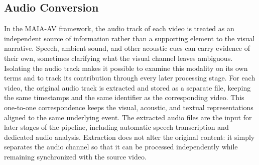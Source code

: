 \subsection*{Audio Conversion}
In the MAIA-AV framework, the audio track of each video is treated as an independent source of information rather than a supporting element to the visual narrative. Speech, ambient sound, and other acoustic cues can carry evidence of their own, sometimes clarifying what the visual channel leaves ambiguous. Isolating the audio track makes it possible to examine this modality on its own terms and to track its contribution through every later processing stage.
For each video, the original audio track is extracted and stored as a separate file, keeping the same timestamps and the same identifier as the corresponding video. This one-to-one correspondence keeps the visual, acoustic, and textual representations aligned to the same underlying event.
The extracted audio files are the input for later stages of the pipeline, including automatic speech transcription and dedicated audio analysis. Extraction does not alter the original content: it simply separates the audio channel so that it can be processed independently while remaining synchronized with the source video.
